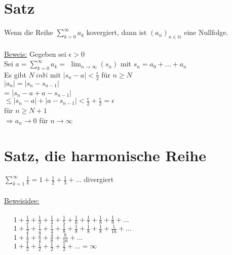 \section{Satz}
Wenn die Reihe $\displaystyle\sum\limits_{k=0}^{\infty} a_k $ kovergiert, dann ist $(a_n)_{n \in \mathbb{N}}$ eine Nullfolge.\\ \\
\underline{Beweis:} Gegeben sei $\epsilon > 0$\\
Sei $a = \displaystyle\sum\limits_{k = 0}^{\infty} a_k = $ $\displaystyle\lim_{n \to \infty}(s_n)$ mit $s_n = a_0 + ... + a_n$\\
Es gibt $ N \ in \mathbb{N}$ mit $|s_n - a| < \displaystyle\frac{\epsilon}{2}$ für $n \geq N$\\
$|a_n| = |s_n - s_{n-1}|$\\
\phantom{$|a_n| $} = $|s_n - a + a - s_{n-1}|$\\
\phantom{$|a_n| $} $\leq |s_n - a| + |a - s_{n-1}| < \displaystyle\frac{\epsilon}{2} + \displaystyle\frac{\epsilon}{2} = \epsilon$\\
für $n \geq N + 1$\\
$\Rightarrow a_n \to 0$ für $n \to \infty$\\

\section{Satz, die harmonische Reihe}
$\displaystyle\sum\limits_{k = 1}^{\infty} \frac{1}{k}= 1 + \frac{1}{2} + \frac{1}{3} + ...$ divergiert\\
\\
\underline{Beweisidee:}\\
\\
$\phantom{= }1 + \displaystyle\frac{1}{2} + \displaystyle\frac{1}{3} + \displaystyle\frac{1}{4} + \displaystyle\frac{1}{5} + \displaystyle\frac{1}{6} + \displaystyle\frac{1}{7} + \displaystyle\frac{1}{8} + \displaystyle\frac{1}{9} + ...$\\
$\phantom{\geq }1 + \displaystyle\frac{1}{2} + \displaystyle\frac{1}{4} + \displaystyle\frac{1}{4} + \displaystyle\frac{1}{8} + \displaystyle\frac{1}{8} + \displaystyle\frac{1}{8} + \displaystyle\frac{1}{8} + \displaystyle\frac{1}{16} + ...$\\
$\phantom{= }1 + \displaystyle\frac{1}{2} + \displaystyle\frac{2}{4} + \displaystyle\frac{4}{8} + \displaystyle\frac{8}{16} + ...$\\
$\phantom{= }1 + \displaystyle\frac{1}{2} + \displaystyle\frac{1}{2} + \displaystyle\frac{1}{2} + \displaystyle\frac{1}{2} + ... = \infty$\\















